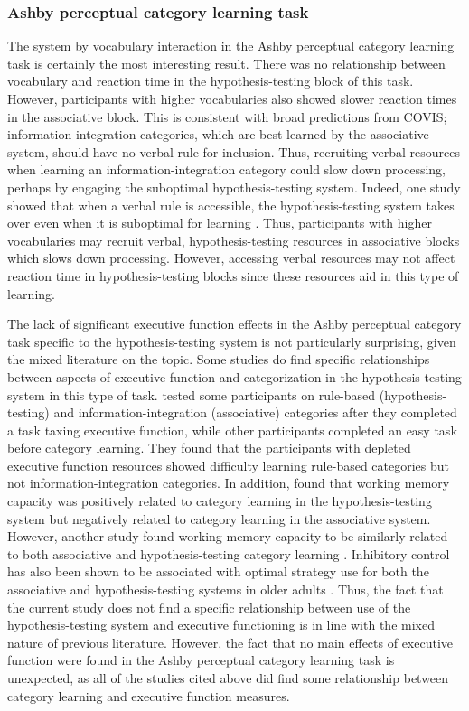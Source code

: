 \documentclass[../dissertation.tex]{subfiles}
\begin{document}
\subsubsection{Ashby perceptual category learning task}
	The system by vocabulary interaction in the Ashby perceptual category learning task is certainly the most interesting result. There was no relationship between vocabulary and reaction time in the hypothesis-testing block of this task. However, participants with higher vocabularies also showed slower reaction times in the associative block. This is consistent with broad predictions from COVIS; information-integration categories, which are best learned by the associative system, should have no verbal rule for inclusion. Thus, recruiting verbal resources when learning an information-integration category could slow down processing, perhaps by engaging the suboptimal hypothesis-testing system. Indeed, one study showed that when a verbal rule is accessible, the hypothesis-testing system takes over even when it is suboptimal for learning \citep{Noseworthy2011}. Thus, participants with higher vocabularies may recruit verbal, hypothesis-testing resources in associative blocks which slows down processing. However, accessing verbal resources may not affect reaction time in hypothesis-testing blocks since these resources aid in this type of learning. \par
	The lack of significant executive function effects in the Ashby perceptual category task specific to the hypothesis-testing system is not particularly surprising, given the mixed literature on the topic. Some studies do find specific relationships between aspects of executive function and categorization in the hypothesis-testing system in this type of task. \citet{Minda2015} tested some participants on rule-based (hypothesis-testing) and information-integration (associative) categories after they completed a task taxing executive function, while other participants completed an easy task before category learning. They found that the participants with depleted executive function resources showed difficulty learning rule-based categories but not information-integration categories. In addition, \citet{DeCaro2008} found that working memory capacity was positively related to category learning in the hypothesis-testing system but negatively related to category learning in the associative system. However, another study found working memory capacity to be similarly related to both associative and hypothesis-testing category learning \citep{Lewandowsky2012}. Inhibitory control has also been shown to be associated with optimal strategy use for both the associative and hypothesis-testing systems in older adults \citep{Maddox2010}. Thus, the fact that the current study does not find a specific relationship between use of the hypothesis-testing system and executive functioning is in line with the mixed nature of previous literature. However, the fact that no main effects of executive function were found in the Ashby perceptual category learning task is unexpected, as all of the studies cited above did find some relationship between category learning and executive function measures.  \par
	
\end{document}
